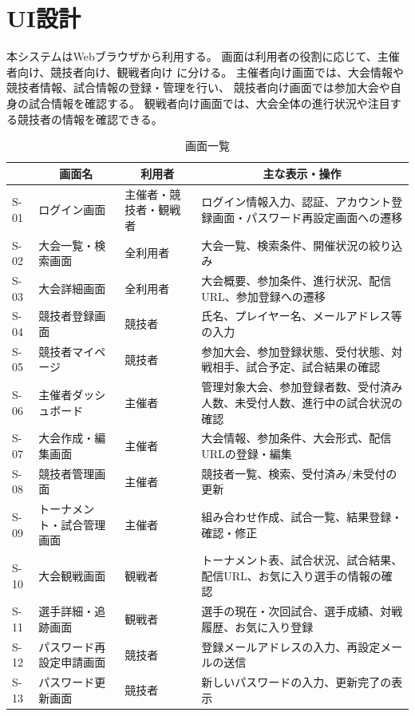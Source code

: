 \section{UI設計}
本システムはWebブラウザから利用する。
画面は利用者の役割に応じて、主催者向け、競技者向け、観戦者向け
に分ける。
主催者向け画面では、大会情報や競技者情報、試合情報の登録・管理を行い、
競技者向け画面では参加大会や自身の試合情報を確認する。
観戦者向け画面では、大会全体の進行状況や注目する競技者の情報を確認できる。

\begin{table}[H]
    \centering
    \caption{画面一覧}
    \label{tab:screen_list}
    \begin{tabularx}{\linewidth}{|l|l|l|X|}
        \hline
        \rowcolor{tableblue}
        \multicolumn{1}{|c|}{画面ID} & \multicolumn{1}{c|}{画面名} & \multicolumn{1}{c|}{利用者} & \multicolumn{1}{c|}{主な表示・操作} \\ \hline
        S-01 & ログイン画面 & 主催者・競技者・観戦者 & ログイン情報入力、認証、アカウント登録画面・パスワード再設定画面への遷移 \\ \hline
        S-02 & 大会一覧・検索画面 & 全利用者 & 大会一覧、検索条件、開催状況の絞り込み \\ \hline
        S-03 & 大会詳細画面 & 全利用者 & 大会概要、参加条件、進行状況、配信URL、参加登録への遷移 \\ \hline
        S-04 & 競技者登録画面 & 競技者 & 氏名、プレイヤー名、メールアドレス等の入力 \\ \hline
        S-05 & 競技者マイページ & 競技者 & 参加大会、参加登録状態、受付状態、対戦相手、試合予定、試合結果の確認 \\ \hline
        S-06 & 主催者ダッシュボード & 主催者 & 管理対象大会、参加登録者数、受付済み人数、未受付人数、進行中の試合状況の確認 \\ \hline
        S-07 & 大会作成・編集画面 & 主催者 & 大会情報、参加条件、大会形式、配信URLの登録・編集 \\ \hline
        S-08 & 競技者管理画面 & 主催者 & 競技者一覧、検索、受付済み/未受付の更新 \\ \hline
        S-09 & トーナメント・試合管理画面 & 主催者 & 組み合わせ作成、試合一覧、結果登録・確認・修正 \\ \hline
        S-10 & 大会観戦画面 & 観戦者 & トーナメント表、試合状況、試合結果、配信URL、お気に入り選手の情報の確認 \\ \hline
        S-11 & 選手詳細・追跡画面 & 観戦者 & 選手の現在・次回試合、選手成績、対戦履歴、お気に入り登録 \\ \hline
        S-12 & パスワード再設定申請画面 & 競技者 & 登録メールアドレスの入力、再設定メールの送信 \\ \hline
        S-13 & パスワード更新画面 & 競技者 & 新しいパスワードの入力、更新完了の表示 \\ \hline
    \end{tabularx}
\end{table}

